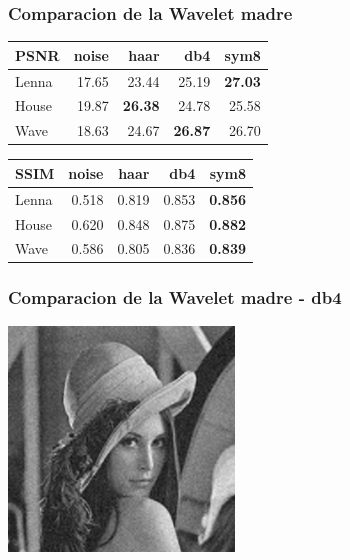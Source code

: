 \documentclass{beamer}
\begin{document}
  \begin{frame}
    \frametitle{Comparacion de la Wavelet madre}
    \centering
    \begin{tabular}{lrrrr}
      \toprule
      {PSNR} &  noise &   haar &    db4 &   sym8 \\
      \midrule
      Lenna &  17.65 &  23.44 & 25.19 &  \bf{27.03} \\
      House &  19.87 &  \bf{26.38} &  24.78 &  25.58 \\
      Wave &  18.63 &  24.67 &  \bf{26.87} &  26.70 \\
      \bottomrule
      \end{tabular}
  
      \begin{tabular}{lrrrr}
        {SSIM} &  noise &   haar &    db4 &   sym8 \\
        \midrule
        Lenna &  0.518 &  0.819 &  0.853 &  \bf{0.856} \\
        House &  0.620 &  0.848 &  0.875 &  \bf{0.882} \\
        Wave &  0.586 &  0.805 &  0.836 &  \bf{0.839} \\
        \bottomrule
        \end{tabular}
  \end{frame}

  \begin{frame}
    \frametitle{Comparacion de la Wavelet madre - db4}
    
    \centering
    \includegraphics[width=6cm]{imgs/Wavelets/2_normal_soft_db4_Lenna.jpg}
   
  
  \end{frame}
\end{document}
